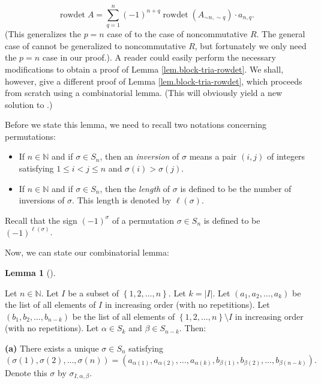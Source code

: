 \documentclass
[numbers=enddot,12pt,final,onecolumn,notitlepage,english]{scrartcl}%
\theoremstyle{definition}
\newtheorem{lem}[theo]{Lemma}
\newenvironment{lemma}[1][]
{\begin{lem}[#1]\begin{leftbar}}
{\end{leftbar}\end{lem}}
\let\sumnonlimits\sum
\renewcommand{\sum}{\sumnonlimits\limits}
\newenvironment{verlong}{}{}
\begin{document}
\begin{verlong}
{\[
\operatorname*{rowdet}A=\sum_{q=1}^{n}\left(  -1\right)  ^{n+q}%
\operatorname*{rowdet}\left(  A_{\sim n,\sim q}\right)  \cdot a_{n,q}.
\]
(This generalizes the $p=n$ case of \cite[Theorem 6.82 \textbf{(a)}]{detnotes}
to the case of noncommutative $R$. The general case of \cite[Theorem 6.82
\textbf{(a)}]{detnotes} cannot be generalized to noncommutative $R$, but
fortunately we only need the $p=n$ case in our proof.)}. A reader could easily
perform the necessary modifications to obtain a proof of Lemma
\ref{lem.block-tria-rowdet}. We shall, however, give a different proof of
Lemma \ref{lem.block-tria-rowdet}, which proceeds from scratch using a
combinatorial lemma. (This will obviously yield a new solution to
\cite[Exercise 6.29]{detnotes}.)

Before we state this lemma, we need to recall two notations concerning permutations:

\begin{itemize}
\item If $n\in\mathbb{N}$ and if $\sigma\in S_{n}$, then an \emph{inversion}
of $\sigma$ means a pair $\left(  i,j\right)  $ of integers satisfying $1\leq
i<j\leq n$ and $\sigma\left(  i\right)  >\sigma\left(  j\right)  $.

\item If $n\in\mathbb{N}$ and if $\sigma\in S_{n}$, then the \emph{length} of
$\sigma$ is defined to be the number of inversions of $\sigma$. This length is
denoted by $\ell\left(  \sigma\right)  $.
\end{itemize}

Recall that the sign $\left(  -1\right)  ^{\sigma}$ of a permutation
$\sigma\in S_{n}$ is defined to be $\left(  -1\right)  ^{\ell\left(
\sigma\right)  }$.

Now, we can state our combinatorial lemma:

\begin{lemma}
\label{lem.lalbe}Let $n\in\mathbb{N}$. Let $I$ be a subset of $\left\{
1,2,\ldots,n\right\}  $. Let $k=\left\vert I\right\vert $. Let $\left(
a_{1},a_{2},\ldots,a_{k}\right)  $ be the list of all elements of $I$ in
increasing order (with no repetitions). Let $\left(  b_{1},b_{2}%
,\ldots,b_{n-k}\right)  $ be the list of all elements of $\left\{
1,2,\ldots,n\right\}  \setminus I$ in increasing order (with no repetitions).
Let $\alpha\in S_{k}$ and $\beta\in S_{n-k}$. Then:

\textbf{(a)} There exists a unique $\sigma\in S_{n}$ satisfying%
\[
\left(  \sigma\left(  1\right)  ,\sigma\left(  2\right)  ,\ldots,\sigma\left(
n\right)  \right)  =\left(  a_{\alpha\left(  1\right)  },a_{\alpha\left(
2\right)  },\ldots,a_{\alpha\left(  k\right)  },b_{\beta\left(  1\right)
},b_{\beta\left(  2\right)  },\ldots,b_{\beta\left(  n-k\right)  }\right)  .
\]
Denote this $\sigma$ by $\sigma_{I,\alpha,\beta}$.


\end{lemma}
\end{verlong}
\end{document}
